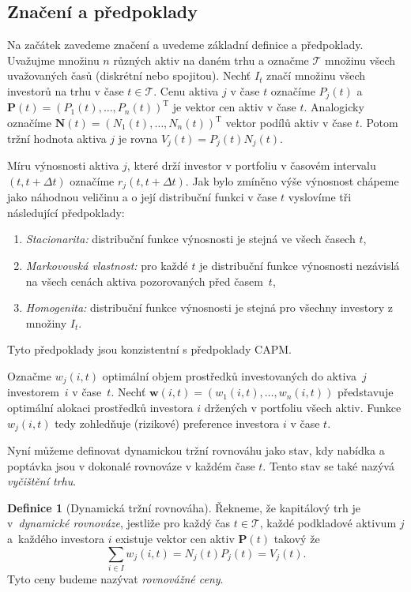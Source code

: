 \documentclass[a4paper,12pt]{report}
\theoremstyle{definition} \newtheorem{definice}[veta]{Definice}
\theoremstyle{remark}
\begin{document}
\subsection{Značení a předpoklady}
Na začátek zavedeme značení a  uvedeme základní definice a předpoklady. 
Uvažujme množinu $n$ různých aktiv na daném trhu a označme $\mathcal{T}$ množinu všech uvažovaných časů (diskrétní nebo spojitou).
Nechť $I_t$ značí množinu všech investorů na trhu v čase $t\in \mathcal{T}$.
Cenu aktiva $j$ v čase $t$ označíme $P_j(t)$ a~$\boldsymbol{P}(t)=(P_1(t),\dots,P_n(t))^\mathrm{T}$ je vektor cen aktiv v čase $t$.
Analogicky označíme $\boldsymbol{N}(t)=(N_1(t),\dots,N_n(t))^\mathrm{T}$ vektor podílů aktiv v čase $t$.
Potom tržní hodnota aktiva $j$ je rovna $V_j(t)=P_j(t)N_j(t)$.

Míru výnosnosti aktiva $j$, které drží investor v portfoliu v časovém intervalu $(t,t+\Delta t)$ označíme $r_j(t,t+\Delta t)$.
Jak bylo zmíněno výše výnosnost chápeme jako náhodnou veličinu a o její distribuční funkci v čase $t$ vyslovíme tři následující předpoklady:
\begin{enumerate}
\item \label{Stacionarita} \textit{Stacionarita:} distribuční funkce výnosnosti  je stejná ve všech časech $t$,                                                                            
\item \label{Martingalvl} \textit{Markovovská vlastnost:} pro každé $t$ je distribuční funkce výnosnosti nezávislá na všech cenách aktiva pozorovaných před časem~$t$,
\item \label{Homogenita} \textit{Homogenita:} distribuční funkce výnosnosti je stejná pro všechny investory z množiny $I_t$. 
\end{enumerate} 
Tyto předpoklady jsou konzistentní s předpoklady CAPM.

Označme $w_{j}(i,t)$ optimální objem prostředků investovaných do aktiva~$j$ investorem~$i$ v čase~$t$.
Nechť $\boldsymbol{w}(i,t)=(w_{1}(i,t),\dots,w_{n}(i,t))$ představuje optimální alokaci prostředků investora $i$ držených v portfoliu všech aktiv.
Funkce $w_{j}(i,t)$ tedy zohledňuje (rizikové) preference investora $i$ v čase $t$.
  
Nyní můžeme definovat dynamickou tržní rovnováhu jako stav, kdy  nabídka a poptávka jsou v dokonalé rovnováze v každém čase $t$.
Tento stav se také nazývá \textit{vyčištění trhu}.
         
\begin{definice}[Dynamická tržní rovnováha]
Řekneme, že kapitálový trh je v~\textit{dynamické rovnováze}, jestliže pro každý čas $t\in \mathcal{T}$, každé podkladové aktivum $j$ a~každého investora $i$ existuje vektor cen aktiv $\boldsymbol{P}(t)$ takový že
$$\sum_{i\in I} w_{j}(i,t)=N_j(t)P_j(t)=V_j(t).$$
Tyto ceny budeme nazývat \textit{rovnovážné ceny}.
\end{definice}
\end{document}
